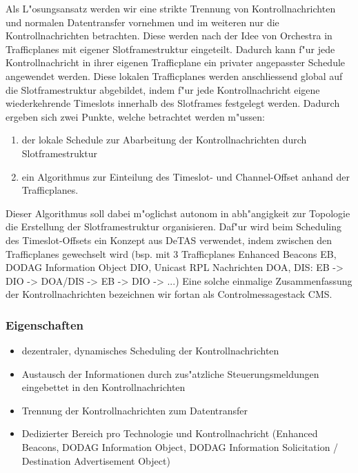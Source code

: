 Als L"osungsansatz werden wir eine strikte Trennung von Kontrollnachrichten und normalen
Datentransfer vornehmen und im weiteren nur die Kontrollnachrichten betrachten.
Diese werden nach der Idee von Orchestra in Trafficplanes mit eigener Slotframestruktur
eingeteilt. Dadurch kann f"ur jede Kontrollnachricht in ihrer eigenen Trafficplane
ein privater angepasster Schedule angewendet werden. Diese lokalen Trafficplanes
werden anschliessend global auf die Slotframestruktur abgebildet, indem f"ur jede
Kontrollnachricht eigene wiederkehrende Timeslots innerhalb des Slotframes festgelegt werden.
Dadurch ergeben sich zwei Punkte, welche betrachtet werden m"ussen:
\begin{enumerate}
  \item der lokale Schedule zur Abarbeitung der Kontrollnachrichten durch Slotframestruktur
  \item ein Algorithmus zur Einteilung des Timeslot- und Channel-Offset anhand der Trafficplanes.
\end{enumerate}

Dieser Algorithmus soll dabei m"oglichst autonom in abh"angigkeit zur Topologie
die Erstellung der Slotframestruktur organisieren. Daf"ur wird beim Scheduling
des Timeslot-Offsets ein Konzept aus DeTAS verwendet, indem zwischen den Trafficplanes
gewechselt wird (bsp. mit 3 Trafficplanes Enhanced Beacons EB, DODAG Information Object DIO,
Unicast RPL Nachrichten DOA, DIS: EB -> DIO -> DOA/DIS -> EB -> DIO -> ...)
Eine solche einmalige Zusammenfassung der Kontrollnachrichten bezeichnen wir
fortan als Controlmessagestack CMS.

\subsubsection{Eigenschaften}
\label{subsubsec:di_eigenschaften}


\begin{itemize}
  \item dezentraler, dynamisches Scheduling der Kontrollnachrichten
  \item Austausch der Informationen durch zus"atzliche Steuerungsmeldungen
  eingebettet in den Kontrollnachrichten
  \item Trennung der Kontrollnachrichten zum Datentransfer
  \item Dedizierter Bereich pro Technologie und Kontrollnachricht (Enhanced Beacons, DODAG Information Object,
  DODAG Information Solicitation / Destination Advertisement Object)
\end{itemize}

